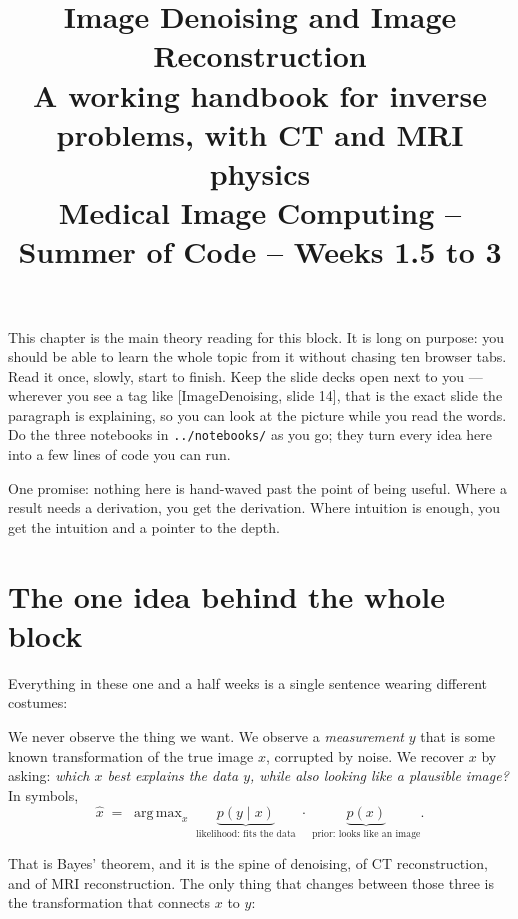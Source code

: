 \documentclass[11pt]{article}
\title{\textbf{Image Denoising and Image Reconstruction}\\[2pt]
\large A working handbook for inverse problems, with CT and MRI physics\\[6pt]
\normalsize Medical Image Computing -- Summer of Code -- Weeks 1.5 to 3}
\author{}
\date{}
\newcommand{\xhat}{\hat{x}}
\newcommand{\deck}[1]{\textsf{\small[#1]}}
\DeclareMathOperator*{\argmax}{arg\,max}
\begin{document}
\maketitle
\vspace{-2.2em}

\begin{keybox}
This chapter is the main theory reading for this block. It is long on purpose:
you should be able to learn the whole topic from it without chasing ten
browser tabs. Read it once, slowly, start to finish. Keep the slide decks open
next to you --- wherever you see a tag like \deck{ImageDenoising, slide 14},
that is the exact slide the paragraph is explaining, so you can look at the
picture while you read the words. Do the three notebooks in \texttt{../notebooks/}
as you go; they turn every idea here into a few lines of code you can run.

One promise: nothing here is hand-waved past the point of being useful. Where a
result needs a derivation, you get the derivation. Where intuition is enough,
you get the intuition and a pointer to the depth.
\end{keybox}

\tableofcontents
\bigskip

\section{The one idea behind the whole block}

Everything in these one and a half weeks is a single sentence wearing
different costumes:

\begin{keybox}
We never observe the thing we want. We observe a \emph{measurement} $y$ that is
some known transformation of the true image $x$, corrupted by noise. We recover
$x$ by asking: \emph{which $x$ best explains the data $y$, while also looking
like a plausible image?} In symbols,
\[
\xhat \;=\; \argmax_{x}\; \underbrace{p(y \mid x)}_{\text{likelihood: fits the data}}
\;\cdot\; \underbrace{p(x)}_{\text{prior: looks like an image}} .
\]
\end{keybox}

That is Bayes' theorem, and it is the spine of denoising, of CT reconstruction,
and of MRI reconstruction. The only thing that changes between those three is
the transformation that connects $x$ to $y$:
\end{document}

